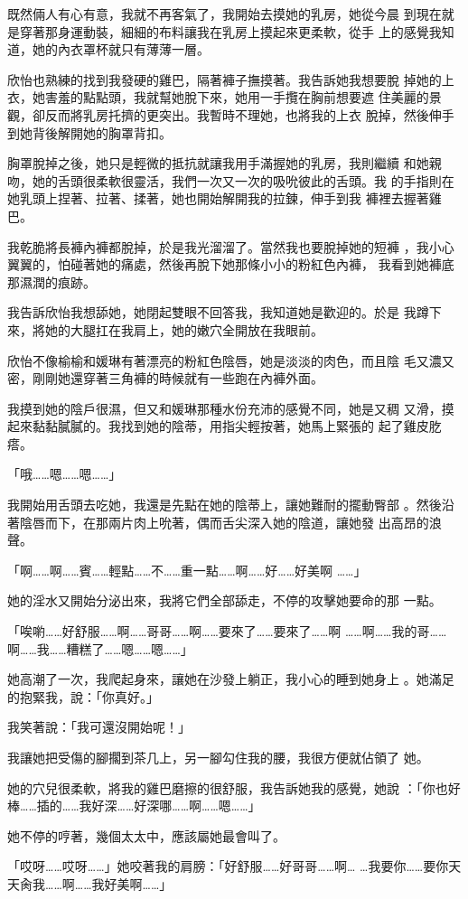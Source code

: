 既然倆人有心有意，我就不再客氣了，我開始去摸她的乳房，她從今晨
到現在就是穿著那身運動裝，細細的布料讓我在乳房上摸起來更柔軟，從手
上的感覺我知道，她的內衣罩杯就只有薄薄一層。

欣怡也熟練的找到我發硬的雞巴，隔著褲子撫摸著。我告訴她我想要脫
掉她的上衣，她害羞的點點頭，我就幫她脫下來，她用一手攬在胸前想要遮
住美麗的景觀，卻反而將乳房托擠的更突出。我暫時不理她，也將我的上衣
脫掉，然後伸手到她背後解開她的胸罩背扣。

胸罩脫掉之後，她只是輕微的抵抗就讓我用手滿握她的乳房，我則繼續
和她親吻，她的舌頭很柔軟很靈活，我們一次又一次的吸吮彼此的舌頭。我
的手指則在她乳頭上捏著、拉著、揉著，她也開始解開我的拉鍊，伸手到我
褲裡去握著雞巴。

我乾脆將長褲內褲都脫掉，於是我光溜溜了。當然我也要脫掉她的短褲
，我小心翼翼的，怕碰著她的痛處，然後再脫下她那條小小的粉紅色內褲，
我看到她褲底那濕潤的痕跡。

我告訴欣怡我想舔她，她閉起雙眼不回答我，我知道她是歡迎的。於是
我蹲下來，將她的大腿扛在我肩上，她的嫩穴全開放在我眼前。

欣怡不像榆榆和媛琳有著漂亮的粉紅色陰唇，她是淡淡的肉色，而且陰
毛又濃又密，剛剛她還穿著三角褲的時候就有一些跑在內褲外面。

我摸到她的陰戶很濕，但又和媛琳那種水份充沛的感覺不同，她是又稠
又滑，摸起來黏黏膩膩的。我找到她的陰蒂，用指尖輕按著，她馬上緊張的
起了雞皮肐瘩。

「哦……嗯……嗯……」

我開始用舌頭去吃她，我還是先點在她的陰蒂上，讓她難耐的擺動臀部
。然後沿著陰唇而下，在那兩片肉上吮著，偶而舌尖深入她的陰道，讓她發
出高昂的浪聲。

「啊……啊……賓……輕點……不……重一點……啊……好……好美啊
……」

她的淫水又開始分泌出來，我將它們全部舔走，不停的攻擊她要命的那
一點。

「唉喲……好舒服……啊……哥哥……啊……要來了……要來了……啊
……啊……我的哥……啊……我……糟糕了……嗯……嗯……」

她高潮了一次，我爬起身來，讓她在沙發上躺正，我小心的睡到她身上
。她滿足的抱緊我，說：「你真好。」

我笑著說：「我可還沒開始呢！」

我讓她把受傷的腳擱到茶几上，另一腳勾住我的腰，我很方便就佔領了
她。

她的穴兒很柔軟，將我的雞巴磨擦的很舒服，我告訴她我的感覺，她說
：「你也好棒……插的……我好深……好深哪……啊……嗯……」

她不停的哼著，幾個太太中，應該屬她最會叫了。

「哎呀……哎呀……」她咬著我的肩膀：「好舒服……好哥哥……啊…
…我要你……要你天天肏我……啊……我好美啊……」

